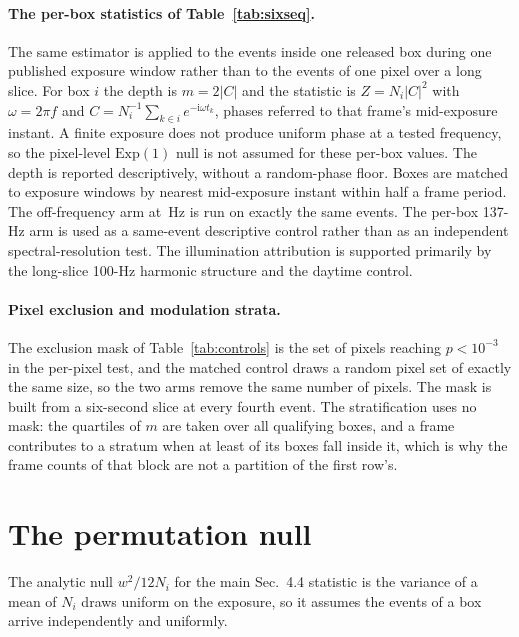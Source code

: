 \documentclass[10pt,twocolumn,letterpaper]{article}
\begin{document}
\paragraph{The per-box statistics of Table~\ref{tab:sixseq}.} The same estimator is applied
to the events inside one released box during one published exposure window rather
than to the events of one pixel over a long slice. For box $i$ the depth is
$m=2|C|$ and the statistic is $Z=N_{i}|C|^{2}$ with
$\omega=2\pi f$ and $C=N_{i}^{-1}\sum_{k\in i}e^{-\mathrm{i}\omega t_{k}}$, phases referred to that
frame's mid-exposure instant. A finite exposure does not produce uniform phase
at a tested frequency, so the pixel-level $\mathrm{Exp}(1)$ null is not assumed
for these per-box values. The depth is reported descriptively, without a
random-phase floor. Boxes are matched to exposure windows by nearest mid-exposure
instant within half a frame period. The off-frequency arm at
\flickerCtrlHz\,Hz is run on exactly the same events. The per-box 137-Hz arm is used as a
same-event descriptive control rather than as an independent spectral-resolution test. The
illumination attribution is supported primarily by the long-slice 100-Hz harmonic structure
and the daytime control.

\paragraph{Pixel exclusion and modulation strata.} The exclusion mask of
Table~\ref{tab:controls} is the set of pixels reaching $p<10^{-3}$ in the
per-pixel test, and the
matched control draws a random pixel set of exactly the same size, so the two
arms remove the same number of pixels. The mask is built from a six-second slice
at every fourth event. The stratification uses no mask: the quartiles of $m$ are
taken over all \modBoxes{} qualifying boxes, and a frame contributes to a stratum
when at least \minObjects{} of its boxes fall inside it, which is why the frame
counts of that block are not a partition of the first row's.

\section{The permutation null}
\label{sup:perm}

The analytic null $w^{2}/12N_{i}$ for the main Sec.~4.4 statistic is the variance of a mean of
$N_{i}$ draws uniform on the exposure, so it assumes the events of a box arrive
independently and uniformly.
\end{document}
